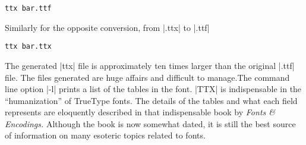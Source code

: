 \begin{verbatim}
ttx bar.ttf
\end{verbatim}

Similarly for the opposite conversion, from |.ttx| to |.ttf|

\begin{verbatim}
ttx bar.ttx
\end{verbatim}

The generated |ttx| file is approximately ten times larger than the original |.ttf| file. The files generated are huge affairs and difficult to manage.The command line option |-l| prints a list of the tables in the font. |TTX| is indispensable in the ``humanization'' of TrueType fonts. The details of the tables and what each field represents are eloquently described in that indispensable book by  \textit{Fonts \& Encodings.} Although the book is now somewhat dated, it is still the best source of information on many esoteric topics related to fonts. 





